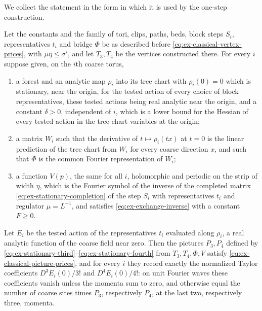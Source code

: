 We collect the statement in the form in which it is used by the
one-step construction.

\begin{proposition}
\label{prop:ex-classical-stationary-pictures}
Let the constants and the family of tori, clips, paths, beds, block
steps $S_i$, representatives $t_i$ and bridge $\Phi$ be as described
before \eqref{eq:ex-classical-vertex-prices}, with $\mu\eta\leq\sigma'$,
and let $T_3,T_4$ be the vertices constructed there. For every $i$
suppose given, on the $i$th coarse torus,
\begin{enumerate}
\item a forest and an analytic map $\rho_i$ into its tree chart with
  $\rho_i(0)=0$ which is stationary, near the origin, for the tested
  action of every choice of block representatives, these tested
  actions being real analytic near the origin, and a constant
  $\delta>0$, independent of $i$, which is a lower bound for the
  Hessian of every tested action in the tree-chart variables at the
  origin;
\item a matrix $W_i$ such that the derivative of
  $t\mapsto\rho_i(tx)$ at $t=0$ is the linear prediction of the tree
  chart from $W_i$ for every coarse direction $x$, and such that
  $\Phi$ is the common Fourier representation of $W_i$;
\item a function $V(p)$, the same for all $i$, holomorphic and periodic
  on the strip of width $\eta$, which is the Fourier symbol of the
  inverse of the completed matrix \eqref{eq:ex-stationary-completion}
  of the step $S_i$ with representatives $t_i$ and regulator
  $\mu=L^{-1}$, and satisfies
  \eqref{eq:ex-exchange-inverse} with a constant $F\geq0$.
\end{enumerate}
Let $E_i$ be the tested action of the representatives $t_i$ evaluated
along $\rho_i$, a real analytic function of the coarse field near
zero. Then the pictures $P_3,P_4$ defined by
\eqref{eq:ex-stationary-third}--\eqref{eq:ex-stationary-fourth} from
$T_3,T_4,\Phi,V$ satisfy \eqref{eq:ex-classical-picture-prices}, and for
every $i$ they record exactly the normalized Taylor coefficients
$D^3E_i(0)/3!$ and $D^4E_i(0)/4!$: on unit Fourier waves these
coefficients vanish unless the momenta sum to zero, and otherwise equal
the number of coarse sites times $P_3$, respectively $P_4$, at the
last two, respectively three, momenta.
\end{proposition}
